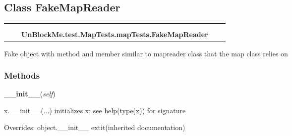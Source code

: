 \subsection{Class FakeMapReader}

    \label{UnBlockMe:test:MapTests:mapTests:FakeMapReader}
\begin{tabular}{cccccc}
\multicolumn{2}{r}{\settowidth{\BCL}{object}\multirow{2}{\BCL}{object}}
&&
  \\\cline{3-3}
  &&\multicolumn{1}{c|}{}
&&
  \\
&&\multicolumn{2}{l}{\textbf{UnBlockMe.test.MapTests.mapTests.FakeMapReader}}
\end{tabular}

Fake object with method and member similar to mapreader class that the map 
class relies on



  \subsubsection{Methods}

    \vspace{0.5ex}

\hspace{.8\funcindent}\begin{boxedminipage}{\funcwidth}

    \raggedright \textbf{\_\_init\_\_}(\textit{self})

\setlength{\parskip}{2ex}
    x.\_\_init\_\_(...) initializes x; see help(type(x)) for signature

\setlength{\parskip}{1ex}
      Overrides: object.\_\_init\_\_ 	extit{(inherited documentation)}

    \end{boxedminipage}

    \label{UnBlockMe:test:MapTests:mapTests:FakeMapReader:get}

    \vspace{0.5ex}

